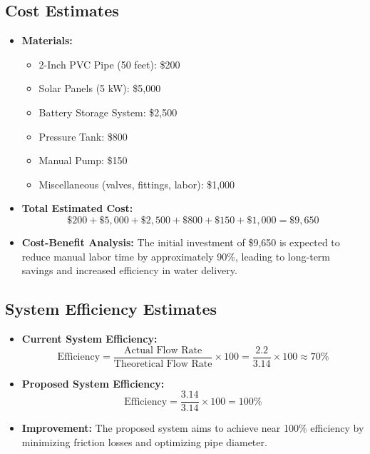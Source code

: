 \documentclass[12pt]{report}
\begin{document}
    \subsection{Cost Estimates}
    \begin{itemize}
        \item \textbf{Materials:}
        \begin{itemize}
            \item 2-Inch PVC Pipe (50 feet): \$200
            \item Solar Panels (5 kW): \$5,000
            \item Battery Storage System: \$2,500
            \item Pressure Tank: \$800
            \item Manual Pump: \$150
            \item Miscellaneous (valves, fittings, labor): \$1,000
        \end{itemize}
        
        \item \textbf{Total Estimated Cost:}
        \[
        \$200 + \$5,000 + \$2,500 + \$800 + \$150 + \$1,000 = \$9,650
        \]
        
        \item \textbf{Cost-Benefit Analysis:}
        The initial investment of \$9,650 is expected to reduce manual labor time by approximately 90\%, leading to long-term savings and increased efficiency in water delivery.
    \end{itemize}
    
    \subsection{System Efficiency Estimates}
    \begin{itemize}
        \item \textbf{Current System Efficiency:} 
        \[
        \text{Efficiency} = \frac{\text{Actual Flow Rate}}{\text{Theoretical Flow Rate}} \times 100 = \frac{2.2}{3.14} \times 100 \approx 70\%
        \]
        
        \item \textbf{Proposed System Efficiency:}
        \[
        \text{Efficiency} = \frac{3.14}{3.14} \times 100 = 100\%
        \]
        
        \item \textbf{Improvement:} The proposed system aims to achieve near 100\% efficiency by minimizing friction losses and optimizing pipe diameter.
    \end{itemize}
    
\end{document}
